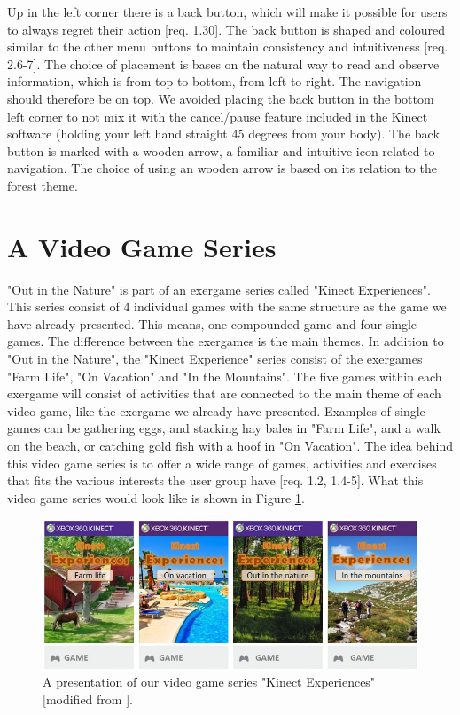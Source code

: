 Up in the left corner there is a back button, which will make it possible for users to always regret their action [req. 1.30]. The back button is shaped and coloured similar to the other menu buttons to maintain consistency and intuitiveness [req. 2.6-7]. The choice of placement is bases on the natural way to read and observe information, which is from top to bottom, from left to right. The navigation should therefore be on top. We avoided placing the back button in the bottom left corner to not mix it with the cancel/pause feature included in the Kinect software (holding your left hand straight 45 degrees from your body). The back button is marked with a wooden arrow, a familiar and intuitive icon related to navigation. The choice of using an wooden arrow is based on its relation to the forest theme. 
     
\section{A Video Game Series}
"Out in the Nature" is part of an exergame series called "Kinect Experiences". This series consist of 4 individual games with the same structure as the game we have already presented. This means, one compounded game and four single games. The difference between the exergames is the main themes. In addition to "Out in the Nature", the "Kinect Experience" series consist of the exergames "Farm Life", "On Vacation" and "In the Mountains". The five games within each exergame will consist of activities that are connected to the main theme of each video game, like the exergame we already have presented. Examples of single games can be gathering eggs, and stacking hay bales in "Farm Life", and a walk on the beach, or catching gold fish with a hoof in "On Vacation". The idea behind this video game series is to offer a wide range of games, activities and exercises that fits the various interests the user group have [req. 1.2, 1.4-5]. What this video game series would look like is shown in Figure \ref{fig:videogameseriesAlone}. 

\begin{figure} [H]
\centering
\includegraphics[scale=0.65]{videoGameSeriesAlone.jpg}
\caption[Presentation of our video game series]{A presentation of our video game series "Kinect Experiences" [modified from \cite{XboxNettside}].}
\label{fig:videogameseriesAlone}
\end{figure}

